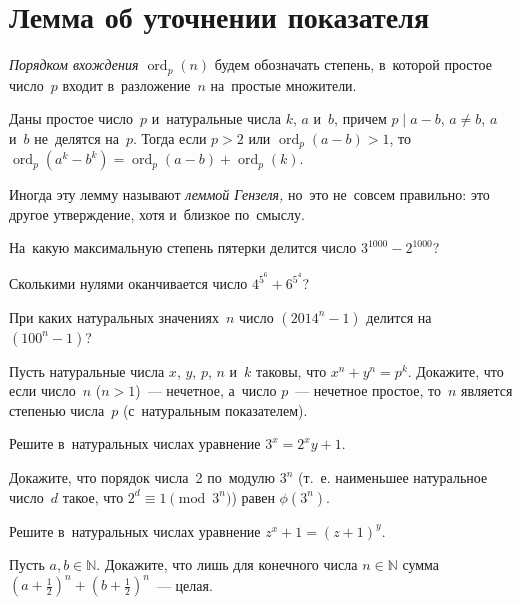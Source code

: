 
\section*{Лемма об уточнении показателя}


\begingroup
    \def\ord{\operatorname{ord}}

\emph{Порядком вхождения $\ord_p (n)$} будем обозначать степень, в~которой
простое число~$p$ входит в~разложение~$n$ на~простые множители.

Даны простое число~$p$ и~натуральные числа $k$, $a$ и~$b$, причем
$p \mid a - b$, $a \neq b$, $a$ и~$b$ не~делятся на~$p$.
Тогда если $p > 2$ или $\ord_p (a - b) > 1$,
то~$\ord_p (a^k - b^k) = \ord_p (a - b) + \ord_p(k)$.

Иногда эту лемму называют \emph{леммой Гензеля,} но~это не~совсем правильно:
это другое утверждение, хотя и~близкое по~смыслу.

\begin{problems}

\item
На~какую максимальную степень пятерки делится число $3^{1000} - 2^{1000}$?

\item
Сколькими нулями оканчивается число $4^{5^6} + 6^{5^4}$?

\item
При каких натуральных значениях~$n$ число $(2014^n - 1)$ делится
на~$(100^n - 1)$?

\item
Пусть натуральные числа $x$, $y$, $p$, $n$ и~$k$ таковы, что
$x^n + y^n = p^k$.
Докажите, что если число~$n$ ($n > 1$)~--- нечетное, а~число $p$~--- нечетное
простое, то~$n$ является степенью числа~$p$ (с~натуральным показателем).

\item
Решите в~натуральных числах уравнение $3^{x} = 2^{x} y + 1$.

\item
Докажите, что порядок числа~2 по~модулю $3^n$ (т.~е. наименьшее натуральное
число~$d$ такое, что $2^d \equiv 1 \pmod{3^{n}}$) равен $\phi(3^n)$.

\item
Решите в~натуральных числах уравнение $z^x + 1 = (z + 1)^y$.

\item
Пусть $a, b \in \mathbb{N}$.
Докажите, что лишь для конечного числа $n \in \mathbb{N}$ сумма
$\left(a + \frac{1}{2}\right)^n + \left(b + \frac{1}{2}\right)^n$~--- целая.

\end{problems}

\endgroup %


